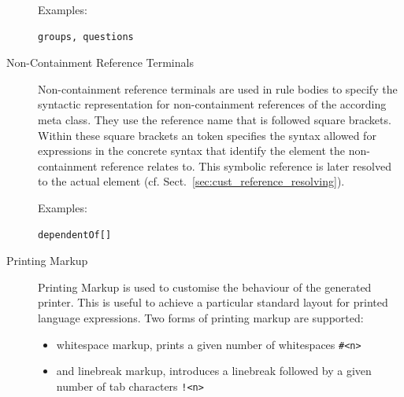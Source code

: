 \begin{description}
       Examples: \begin{verbatim}groups, questions\end{verbatim}

       \item[Non-Containment Reference Terminals] Non-containment reference
       terminals are used in rule bodies to specify the syntactic
       representation for non-containment references of the according meta
       class. They use the reference name that is followed square brackets.
       Within these square brackets an token specifies the syntax allowed for
       expressions in the concrete syntax that identify the element the
       non-containment reference relates to. This symbolic reference is later
       resolved to the actual element (cf.
       Sect.~\ref{sec:cust_reference_resolving}).

       Examples: \begin{verbatim}dependentOf[]\end{verbatim}
       
       \item[Printing Markup] Printing Markup is used to customise the behaviour
       of the generated printer. This is useful to achieve a particular standard
       layout for printed language expressions. Two forms of printing markup are
       supported: 
       \begin{itemize}
         \item whitespace markup, prints a given number of
         whitespaces \texttt{\#<n>}
         \item  and linebreak markup, introduces a linebreak followed by a given 
         number of tab characters \texttt{!<n>}
       \end{itemize}
    \end{description}

